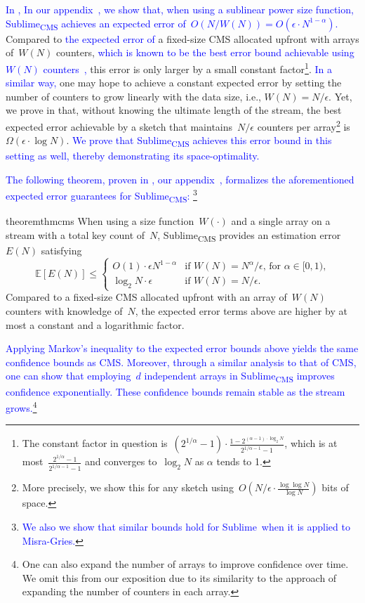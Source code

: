 \documentclass[sigconf]{acmart}
\newcommand{\sketch}{Sublime}
\newcommand{\sketchcms}{\sketch\textsubscript{CMS}\xspace}
\newcommand{\expectation}[1]{\mathbb{E}\left[ #1 \right]}
\begin{document}
\textcolor{blue}{
\ifappendix
In
,
\else
In our appendix~\cite{SublimeArxiv},
\fi
we show that, when using a sublinear power size function, \sketchcms achieves
an expected error of~$O(N/W(N))=O(\epsilon \cdot N^{1-\alpha})$.} Compared to
\textcolor{blue}{the expected error of} a fixed-size CMS allocated upfront with
arrays of~$W(N)$ counters, \textcolor{blue}{which is known to be the best error
bound achievable using~$W(N)$ counters~\cite{CountMin},} this error is only
larger by a small constant factor\footnote{The constant factor in question
is~$(2^{1/\alpha}-1) \cdot \frac{1-2^{(\alpha-1) \cdot \log_2
N}}{2^{1/\alpha-1}-1}$, which is at
most~$\frac{2^{1/\alpha}-1}{2^{1/\alpha-1}-1}$ and converges to~$\log_2 N$ as
$\alpha$ tends to 1.}. \textcolor{blue}{In a similar way,} one may hope to
achieve a constant expected error by setting the number of counters to grow
linearly with the data size, i.e., $W(N)=N/\epsilon$. Yet, we prove in
 that, without knowing
the ultimate length of the stream, the best expected error achievable by a
sketch that maintains~$N/\epsilon$ counters per array\footnote{More precisely,
we show this for any sketch using~$O\left( N/\epsilon \cdot \frac{\log\log
N}{\log N} \right)$ bits of space.} is~$\Omega(\epsilon \cdot \log N)$.
\textcolor{blue}{We prove that \sketchcms achieves this error bound in this
setting as well, thereby demonstrating its space-optimality.}

\textcolor{blue}{The following theorem, proven in
\ifappendix
{},
\else
our appendix~\cite{SublimeArxiv},
\fi
formalizes the aforementioned expected error guarantees for \sketchcms:
\footnote{\textcolor{blue}{We also we show that similar bounds hold for
\sketch\ when it is applied to Misra-Gries.}}
}
\begin{restatable}{theorem}{thmcms}
    \label{thm:cms-w}
    When using a size function~$W(\cdot)$ and a single array on a stream with a
    total key count of~$N$, \sketchcms provides an estimation error~$E(N)$
    satisfying
	$$
    \expectation{E(N)} \leq  
    \begin{cases}
        O(1) \cdot \epsilon N^{1-\alpha} & \text{if $W(N)=N^{\alpha}/\epsilon$, for $\alpha \in [0,1)$,} \\
		\log_2 N \cdot \epsilon & \text{if $W(N)=N/\epsilon$.}
	\end{cases}
    $$
    Compared to a fixed-size CMS allocated upfront with an array of~$W(N)$
    counters with knowledge of~$N$, the expected error terms above are higher
    by at most a constant and a logarithmic factor.
\end{restatable}
\textcolor{blue}{
Applying Markov's inequality to the expected error bounds above yields the same
confidence bounds as CMS. Moreover, through a similar analysis to that of CMS,
one can show that employing~$d$ independent arrays in \sketchcms improves
confidence exponentially. These confidence bounds remain stable as the stream
grows.\footnote{One can also expand the number of arrays to improve confidence
over time. We omit this from our exposition due to its similarity to the
approach of expanding the number of counters in each array.}
}
\end{document}
